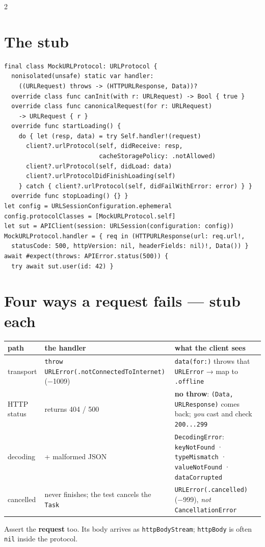 \documentclass[8pt]{extarticle}
\newcommand\ct[1]{\texttt{#1}}
\begin{document}
\begin{multicols}{2}
\section{The stub}
\begin{lstlisting}[language=SwiftSheet]
final class MockURLProtocol: URLProtocol {
  nonisolated(unsafe) static var handler:
    ((URLRequest) throws -> (HTTPURLResponse, Data))?
  override class func canInit(with r: URLRequest) -> Bool { true }
  override class func canonicalRequest(for r: URLRequest)
    -> URLRequest { r }
  override func startLoading() {
    do { let (resp, data) = try Self.handler!(request)
      client?.urlProtocol(self, didReceive: resp,
                          cacheStoragePolicy: .notAllowed)
      client?.urlProtocol(self, didLoad: data)
      client?.urlProtocolDidFinishLoading(self)
    } catch { client?.urlProtocol(self, didFailWithError: error) } }
  override func stopLoading() {} }
let config = URLSessionConfiguration.ephemeral
config.protocolClasses = [MockURLProtocol.self]
let sut = APIClient(session: URLSession(configuration: config))
MockURLProtocol.handler = { req in (HTTPURLResponse(url: req.url!,
  statusCode: 500, httpVersion: nil, headerFields: nil)!, Data()) }
await #expect(throws: APIError.status(500)) {
  try await sut.user(id: 42) }
\end{lstlisting}

\section{Four ways a request fails — stub each}
{\scriptsize\setlength{\tabcolsep}{2pt}
\begin{tabular}{@{}>{\raggedright\arraybackslash}p{11mm}>{\raggedright\arraybackslash}p{31mm}>{\raggedright\arraybackslash}p{34mm}@{}}
\toprule
\textbf{path} & \textbf{the handler} & \textbf{what the client sees}\\
\midrule
transport & \ct{throw URLError(\allowbreak.notConnectedToInternet)} (−1009) & \ct{data(for:)} throws that \ct{URLError} → map to \ct{.offline}\\
HTTP status & returns 404 / 500 & \textbf{no throw}: \ct{(Data, URLResponse)} comes back; \emph{you} cast and check \ct{200...299}\\
decoding & 200 + malformed JSON & \ct{DecodingError}: \ct{keyNotFound} · \ct{typeMismatch} · \ct{valueNotFound} · \ct{dataCorrupted}\\
cancelled & never finishes; the test cancels the \ct{Task} & \ct{URLError(.cancelled)} (−999), \emph{not} \ct{CancellationError}\\
\bottomrule
\end{tabular}}\par
Assert the \textbf{request} too. Its body arrives as \ct{httpBodyStream}; \ct{httpBody} is often
\ct{nil} inside the protocol.


\end{multicols}
\end{document}
